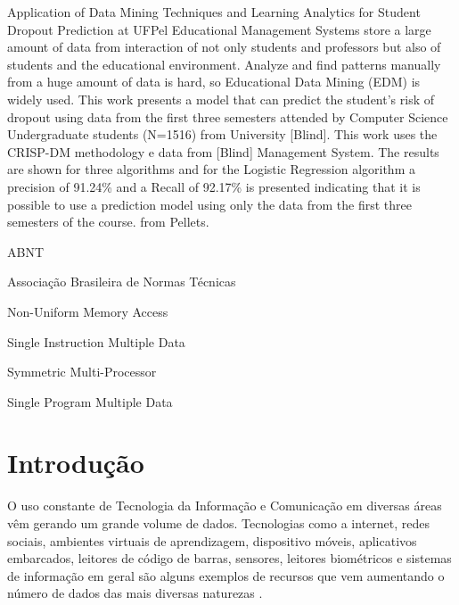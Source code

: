 \documentclass[diss,capa]{texufpel}
\begin{document}
\begin{englishabstract}{Application of Data Mining Techniques and Learning Analytics for Student Dropout Prediction at UFPel}
Educational Management Systems store a large amount of data from interaction of not only students and professors but also of students and the educational environment. Analyze and find patterns manually from a huge amount of data is hard, so Educational Data Mining (EDM) is widely used. This work presents a model that can predict the student's risk of dropout using data from the first three semesters attended by Computer Science Undergraduate students (N=1516) from University [Blind]. This work uses the CRISP-DM methodology e data from [Blind] Management System. The results are shown for three algorithms and for the Logistic Regression algorithm a precision of 91.24\% and a Recall of 92.17\% is presented indicating that it is possible to use a prediction model using only the data from the first three semesters of the course. from Pellets.
\end{englishabstract}

\listoffigures

\listoftables

\begin{listofabbrv}{ABNT}%
        \item[ABNT] Associação Brasileira de Normas Técnicas
        \item[NUMA] Non-Uniform Memory Access
        \item[SIMD] Single Instruction Multiple Data
        \item[SMP] Symmetric Multi-Processor
        \item[SPMD] Single Program Multiple Data
\end{listofabbrv}

\tableofcontents

\chapter{Introdução}

O uso constante de Tecnologia da Informação e Comunicação em diversas áreas vêm gerando um grande volume de dados.
Tecnologias como a internet, redes sociais, ambientes virtuais de aprendizagem, dispositivo móveis, aplicativos embarcados, leitores de código de barras, sensores, leitores biométricos e sistemas de informação em geral são alguns exemplos de recursos que vem aumentando o número de dados das mais diversas naturezas \cite{goldschmidt2015data}.
\end{document}
